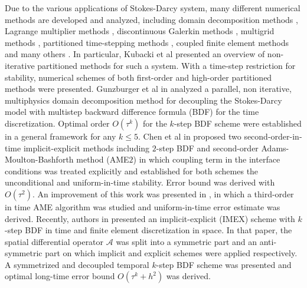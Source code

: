 \documentclass[a4paper, oneside]{book}
\def\calA{{\mathcal{A}}}
\def\calA{{\mathcal{A}}}
\begin{document}
Due to the various applications of Stokes-Darcy system, many different numerical methods are developed and analyzed, including domain decomposition methods \cite{DiscacciatiQuarteroni:2004,BoubendirTlupova:2013,CaoGunzburger:2011,ChenGunzburger:2011,DiscacciatiMiglio:2002,DiscacciatiQuarteroni:2007,FengHeWangZhang:2012,GunzburgerHeLi:2018,VassilevWangYotov:2014,QiuHeLiLin:2020}, Lagrange multiplier methods \cite{LaytonFriedhelmYotov:2003,BabuskaGatica:2010,GaticaMeddahiOyarzua:2008,HuangChenCai:2012}, discontinuous Galerkin methods \cite{KanschatRiviere:2010,LipnikovVassilevYotov:2014,Riviere:2005,RiviereYotov:2005}, multigrid methods \cite{ArbogastGomez:2009,MuXu:2008}, partitioned time-stepping methods \cite{KubackiMoraiti:2015,MuZhu:2010,ShanZheng:2013,ZhangRuiCao:2019}, coupled finite element methods \cite{CaoGunzburgerHu,CamanoGatica:2015,KarperMardalWinther:2009,MarquezMeddahiSayas:2015} and many others \cite{ChenGunzburger:2016,ChenGunzburger:2013,GiraultVassilevYotov:2014,HeJiangQiu:2020}. In particular, 
Kubacki et al \cite{kubacki2017non} presented an overview of non-iterative partitioned methods for such a system. With a time-step restriction for stability, numerical schemes of both first-order and high-order partitioned methods were presented. Gunzburger et al in \cite{GunzburgerHeLi:2018} analyzed a parallel, non iterative, multiphysics domain decomposition method for decoupling the Stokes-Darcy model with multistep backward difference formula (BDF) for the time discretization. Optimal order $O(\tau^k)$ for the $k$-step BDF scheme were established in a general framework for any $k\le5$.
Chen et al in \cite{ChenGunzburger:2013} proposed two second-order-in-time implicit-explicit methods including $2$-step BDF and second-order Adams-Moulton-Bashforth method (AME$2$) in which coupling term in the interface conditions was treated explicitly and established for both schemes the unconditional and uniform-in-time stability. Error bound was derived with $O(\tau^2)$.  An improvement of this work was presented in \cite{ChenGunzburger:2016}, in  which a third-order in time AME algorithm was studied and uniform-in-time error estimate was derived.
Recently, authors in \cite{LiWangZhou:2020} presented an implicit-explicit (IMEX) scheme with $k$-step BDF in time and finite element discretization in space. In that paper, the spatial differential operator $\calA$ was split into a symmetric part and an anti-symmetric part on which implicit and explicit schemes were applied respectively. A symmetrized and decoupled temporal $k$-step BDF scheme was presented and optimal long-time error bound $O(\tau^k+h^2)$ was derived.
\end{document}
